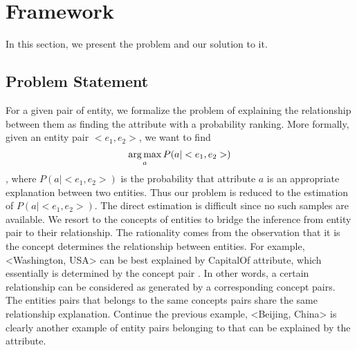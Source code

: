
\section{Framework}


In this section, we present the problem and our solution to it.

\subsection{Problem Statement}

For a given pair of entity, we formalize the problem of explaining the relationship between them as finding the attribute with a probability ranking. More formally, given an entity pair $<e_1, e_2>$, we want to find
$$\operatorname*{arg\,max}_a P(a|<e_1,e_2>)$$,  where $P(a|<e_1, e_2>)$ is the probability that attribute $a$ is an appropriate explanation between two entities. 
Thus our problem is reduced to the estimation of $P(a|<e_1, e_2>)$. The direct estimation is difficult since no such samples are available. We resort to the concepts of entities to bridge the inference from entity pair to their relationship.  The rationality comes from the observation that it is the concept determines the relationship between entities. For example, \ac{<Washington, USA>} can be best explained by \ac{CapitalOf} attribute, which essentially is determined by the concept pair . In other words, a certain relationship can be considered as generated by a corresponding concept pairs.  The entities pairs that belongs to the same concepts pairs share the same relationship explanation. Continue the previous example, \ac{<Beijing, China>} is clearly another example of entity pairs belonging to  that can be explained by the  attribute.

